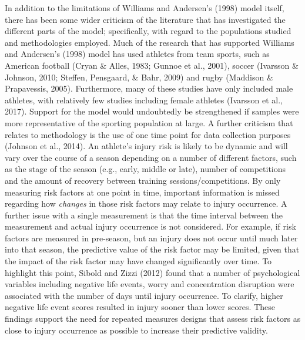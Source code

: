 \documentclass[man,floatsintext]{apa6}
\begin{document}
In addition to the limitations of Williams and Andersen's (1998) model itself, there has been some wider criticism of the literature that has investigated the different parts of the model; specifically, with regard to the populations studied and methodologies employed.
Much of the research that has supported Williams and Andersen's (1998) model has used athletes from team sports, such as American football (Cryan \& Alles, 1983; Gunnoe et al., 2001), soccer (Ivarsson \& Johnson, 2010; Steffen, Pensgaard, \& Bahr, 2009) and rugby (Maddison \& Prapavessis, 2005).
Furthermore, many of these studies have only included male athletes, with relatively few studies including female athletes (Ivarsson et al., 2017).
Support for the model would undoubtedly be strengthened if samples were more representative of the sporting population at large.
A further criticism that relates to methodology is the use of one time point for data collection purposes (Johnson et al., 2014).
An athlete's injury risk is likely to be dynamic and will vary over the course of a season depending on a number of different factors, such as the stage of the season (e.g., early, middle or late), number of competitions and the amount of recovery between training sessions/competitions.
By only measuring risk factors at one point in time, important information is missed regarding how \emph{changes} in those risk factors may relate to injury occurrence.
A further issue with a single measurement is that the time interval between the measurement and actual injury occurrence is not considered.
For example, if risk factors are measured in pre-season, but an injury does not occur until much later into that season, the predictive value of the risk factor may be limited, given that the impact of the risk factor may have changed significantly over time.
To highlight this point, Sibold and Zizzi (2012) found that a number of psychological variables including negative life events, worry and concentration disruption were associated with the number of days until injury occurrence.
To clarify, higher negative life event scores resulted in injury sooner than lower scores.
These findings support the need for repeated measures designs that assess risk factors as close to injury occurrence as possible to increase their predictive validity.
\end{document}
